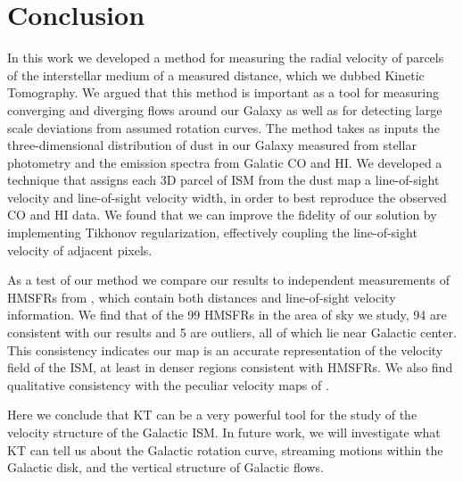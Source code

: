 \section{Conclusion}
\label{sec:conclusion}

In this work we developed a method for measuring the radial velocity of parcels of the interstellar medium of a measured distance, which we dubbed  Kinetic Tomography. We argued that this method is important as a tool for measuring converging and diverging flows around our Galaxy as well as for detecting large scale deviations from assumed rotation curves. The method takes as inputs the three-dimensional distribution of dust in our Galaxy measured from stellar photometry and the emission spectra from Galatic CO and HI. We developed a technique that assigns each 3D parcel of ISM from the dust map a line-of-sight velocity and line-of-sight velocity width, in order to best reproduce the observed CO and HI data. We found that we can improve the fidelity of our solution by implementing Tikhonov regularization, effectively coupling the line-of-sight velocity of adjacent pixels. 

As a test of our method we compare our results to independent measurements of HMSFRs from \Reid{}, which contain both distances and line-of-sight velocity information. We find that of the 99 HMSFRs in the area of sky we study, 94 are consistent with our results and 5 are outliers, all of which lie near Galactic center. This consistency indicates our map is an accurate representation of the velocity field of the ISM, at least in denser regions consistent with HMSFRs. We also find qualitative consistency with the peculiar velocity maps of \citet{1993A&A...275...67B}. 

Here we conclude that KT can be a very powerful tool for the study of the velocity structure of the Galactic ISM. In future work, we will investigate what KT can tell us about the Galactic rotation curve, streaming motions within the Galactic disk, and the vertical structure of Galactic flows.


